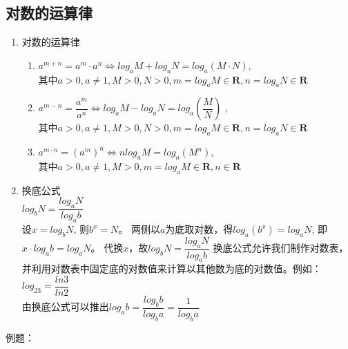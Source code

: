 \subsection*{对数的运算律}
\begin{enumerate}
    \item 对数的运算律
        \begin{enumerate}
            \item $a^{m+n} = a^m \cdot a^n \Longleftrightarrow log_aM + log_aN = log_a(M \cdot N) $, \\
            其中$a > 0, a \neq 1, M>0, N > 0, m = log_aM \in \mathbf{R}, n = log_aN \in \mathbf{R}$
            \item $a^{m-n} = \dfrac{a^m}{a^n} \Longleftrightarrow log_aM - log_aN = log_a(\dfrac{M}{N}) $ , \\
            其中$a > 0, a \neq 1, M>0, N > 0, m = log_aM \in \mathbf{R}, n = log_aN \in \mathbf{R}$
            \item $a^{m \cdot n} = (a^m)^n  \Longleftrightarrow  nlog_aM = log_a(M^n)$, \\
            其中$a > 0, a \neq 1, M>0, m = log_aM \in \mathbf{R}, n \in \mathbf{R}$
        \end{enumerate}
    \item 换底公式 \\
        $log_bN = \dfrac{log_aN}{log_ab}$ \\
        设$x = log_bN$, 则$b^x = N$。 两侧以$a$为底取对数，得$log_a(b^x) = log_aN$, 即$x \cdot log_ab = log_aN$。 代换$x$，故$log_bN = \dfrac{log_aN}{log_ab}$
        换底公式允许我们制作对数表，并利用对数表中固定底的对数值来计算以其他数为底的对数值。例如：$log_23 = \dfrac{ln3}{ln2}$ \\
        由换底公式可以推出$log_ab = \dfrac{log_bb}{log_ba} = \dfrac{1}{log_ba}$
\end{enumerate}
例题：

